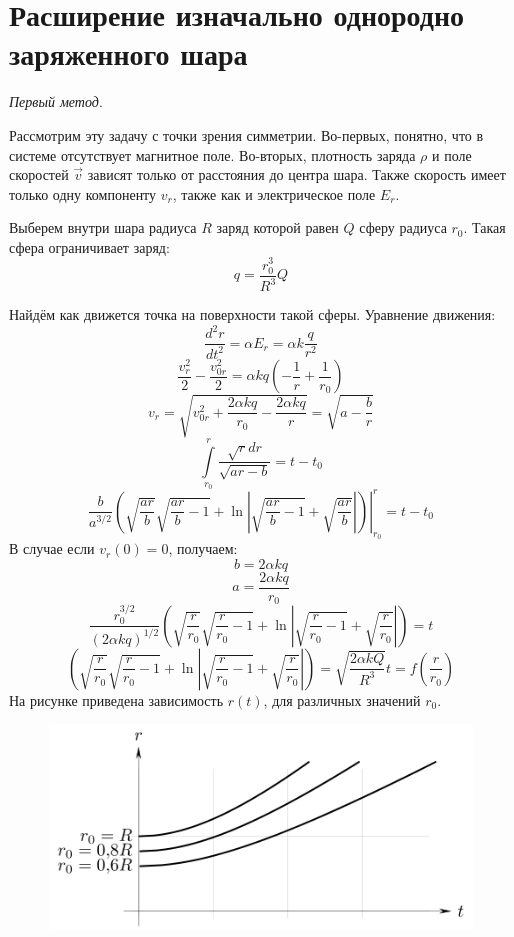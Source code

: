 \section{Расширение изначально однородно заряженного шара}

\textit{Первый метод}. 

Рассмотрим эту задачу с точки зрения симметрии. Во-первых, понятно, что в системе отсутствует магнитное поле. Во-вторых, плотность заряда $\rho$ и поле скоростей $\vec{v}$ зависят только от расстояния до центра шара. Также скорость имеет только одну компоненту $v_r$, также как и электрическое поле $E_r$.
 
Выберем внутри шара радиуса $R$ заряд которой равен $Q$ сферу радиуса $r_0$. Такая сфера ограничивает заряд:
\[
	q = \frac{r_0^3}{R^3} Q
\]

Найдём как движется точка на поверхности такой сферы. Уравнение движения:
\[
	\frac{d^2 r}{dt^2} = \alpha E_r = \alpha  k \frac{q}{r^2}
\]
\[
	\frac{v_r^2}{2} - \frac{v_{0r}^2}{2} = \alpha k q \left(- \frac{1}{r} + \frac{1}{r_0}\right)
\]
\[
	v_r = \sqrt{v_{0r}^2 + \frac{2\alpha kq}{r_0} - \frac{2\alpha k q}{r}} = \sqrt{a - \frac{b}{r}}
\]
\[
	\int\limits_{r_0}^{r} 
	\frac{\sqrt{r} dr}{\sqrt{ar - b}}
	=
	t - t_0
\]
\[
	\frac{b}{a^{3/2}} 
	\left.
	\left(\sqrt{\frac{ar}{b}} \sqrt{\frac{ar}{b}-1} + 
	\ln \left|\sqrt{\frac{ar}{b} - 1} + \sqrt{\frac{ar}{b}}\right|\right) 
	\right|_{r_0}^{r}
	= t - t_0
\]
В случае если $v_{r}(0) = 0$, получаем:
\[
	b = 2\alpha k q
\]
\[
	a = \frac{2\alpha kq}{r_0}
\]
\[
	\frac{r_0^{3/2}}{(2\alpha k q)^{1/2}} 
	\left(\sqrt{\frac{r}{r_0}} \sqrt{\frac{r}{r_0}-1} + 
	\ln \left|\sqrt{\frac{r}{r_0} - 1} + \sqrt{\frac{r}{r_0}}\right|\right)
	= t
\]
\[
	\left(\sqrt{\frac{r}{r_0}} \sqrt{\frac{r}{r_0}-1} + 
	\ln \left|\sqrt{\frac{r}{r_0} - 1} + \sqrt{\frac{r}{r_0}}\right|\right)
	= \sqrt{
		\frac{2\alpha k Q}{R^{3}} } t = f\left(\frac{r}{r_0}\right)
\]
На рисунке приведена зависимость $r(t)$, для различных значений $r_0$.
\begin{figure}[h!]
	\centering
	\includegraphics{images/png/sphere1.png}
\end{figure}
